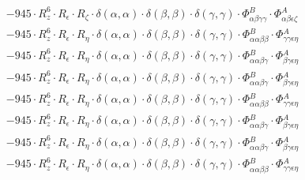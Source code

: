 \documentclass{article}
\begin{document}
\begin{subequations}
\begin{gather}
\begin{array}{c}
 \\[0.2em] 		 - 945 \cdot R_{z}^{6} \cdot R_{\epsilon{}} \cdot R_{\zeta{}} \cdot \delta{}\left(\alpha{}, \alpha{}\right) \cdot \delta{}\left(\beta{}, \beta{}\right) \cdot \delta{}\left(\gamma{}, \gamma{}\right) \cdot \Phi{}^{B}_{\alpha{}\beta{}\gamma{}\gamma{}} \cdot \Phi{}^{A}_{\alpha{}\beta{}\epsilon{}\zeta{}} 
 \\[0.2em] 		 - 945 \cdot R_{z}^{6} \cdot R_{\epsilon{}} \cdot R_{\eta{}} \cdot \delta{}\left(\alpha{}, \alpha{}\right) \cdot \delta{}\left(\beta{}, \beta{}\right) \cdot \delta{}\left(\gamma{}, \gamma{}\right) \cdot \Phi{}^{B}_{\alpha{}\alpha{}\beta{}\beta{}} \cdot \Phi{}^{A}_{\gamma{}\gamma{}\epsilon{}\eta{}} 
 \\[0.2em] 		 - 945 \cdot R_{z}^{6} \cdot R_{\epsilon{}} \cdot R_{\eta{}} \cdot \delta{}\left(\alpha{}, \alpha{}\right) \cdot \delta{}\left(\beta{}, \beta{}\right) \cdot \delta{}\left(\gamma{}, \gamma{}\right) \cdot \Phi{}^{B}_{\alpha{}\alpha{}\beta{}\gamma{}} \cdot \Phi{}^{A}_{\beta{}\gamma{}\epsilon{}\eta{}} 
 \\[0.2em] 		 - 945 \cdot R_{z}^{6} \cdot R_{\epsilon{}} \cdot R_{\eta{}} \cdot \delta{}\left(\alpha{}, \alpha{}\right) \cdot \delta{}\left(\beta{}, \beta{}\right) \cdot \delta{}\left(\gamma{}, \gamma{}\right) \cdot \Phi{}^{B}_{\alpha{}\alpha{}\beta{}\gamma{}} \cdot \Phi{}^{A}_{\beta{}\gamma{}\epsilon{}\eta{}} 
 \\[0.2em] 		 - 945 \cdot R_{z}^{6} \cdot R_{\epsilon{}} \cdot R_{\eta{}} \cdot \delta{}\left(\alpha{}, \alpha{}\right) \cdot \delta{}\left(\beta{}, \beta{}\right) \cdot \delta{}\left(\gamma{}, \gamma{}\right) \cdot \Phi{}^{B}_{\alpha{}\alpha{}\beta{}\beta{}} \cdot \Phi{}^{A}_{\gamma{}\gamma{}\epsilon{}\eta{}} 
 \\[0.2em] 		 - 945 \cdot R_{z}^{6} \cdot R_{\epsilon{}} \cdot R_{\eta{}} \cdot \delta{}\left(\alpha{}, \alpha{}\right) \cdot \delta{}\left(\beta{}, \beta{}\right) \cdot \delta{}\left(\gamma{}, \gamma{}\right) \cdot \Phi{}^{B}_{\alpha{}\alpha{}\beta{}\gamma{}} \cdot \Phi{}^{A}_{\beta{}\gamma{}\epsilon{}\eta{}} 
 \\[0.2em] 		 - 945 \cdot R_{z}^{6} \cdot R_{\epsilon{}} \cdot R_{\eta{}} \cdot \delta{}\left(\alpha{}, \alpha{}\right) \cdot \delta{}\left(\beta{}, \beta{}\right) \cdot \delta{}\left(\gamma{}, \gamma{}\right) \cdot \Phi{}^{B}_{\alpha{}\alpha{}\beta{}\gamma{}} \cdot \Phi{}^{A}_{\beta{}\gamma{}\epsilon{}\eta{}} 
 \\[0.2em] 		 - 945 \cdot R_{z}^{6} \cdot R_{\epsilon{}} \cdot R_{\eta{}} \cdot \delta{}\left(\alpha{}, \alpha{}\right) \cdot \delta{}\left(\beta{}, \beta{}\right) \cdot \delta{}\left(\gamma{}, \gamma{}\right) \cdot \Phi{}^{B}_{\alpha{}\alpha{}\beta{}\beta{}} \cdot \Phi{}^{A}_{\gamma{}\gamma{}\epsilon{}\eta{}} 

\end{array}
\end{gather}
\end{subequations}
\end{document}
